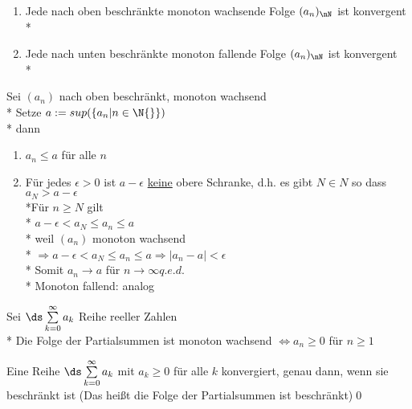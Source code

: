 \begin{enumerate}
\item{Jede nach oben beschränkte monoton wachsende Folge $(a_n)_{\nN}$ ist konvergent\\*
}
\item{Jede nach unten beschränkte monoton fallende Folge $(a_n)_\nN$ ist konvergent\\*
}
\end{enumerate}
\bew
Sei $(a_n)$ nach oben beschränkt, monoton wachsend\\*
Setze $a:= sup(\{a_n | n \in \N{}\})$\\*
dann \begin{enumerate}
\item{$a_n \leq a$ für alle $n$}
\item{Für jedes $\epsilon > 0$ ist $a - \epsilon$ \ul{keine} obere Schranke, d.h. es gibt $N \in N$ so dass $a_N > a - \epsilon$
\\*Für $n \geq N$ gilt\\*
$a - \epsilon < a_N \leq a_n \leq a$\\*
weil $(a_n)$ monoton wachsend\\*
$\Rightarrow a - \epsilon < a_N \leq a_n \leq a \Rightarrow |a_n -a| < \epsilon$\\*
Somit $a_n \to a$ für $n \to \infty$\phantom{XXX}$q.e.d.$\\*
Monoton fallend: analog}
\end{enumerate}

\bem
Sei $\ds\sum\limits_{k=0}^{\infty} a_k$ Reihe reeller Zahlen\\*
Die Folge der Partialsummen ist monoton wachsend $\Leftrightarrow a_n \geq 0$ für $n \geq 1$

Eine Reihe $\ds\sum\limits_{k=0}^{\infty} a_k$ mit $a_k \geq 0$ für alle $k$ konvergiert, genau dann, wenn sie beschränkt ist (Das heißt die Folge der Partialsummen ist beschränkt)\qed

